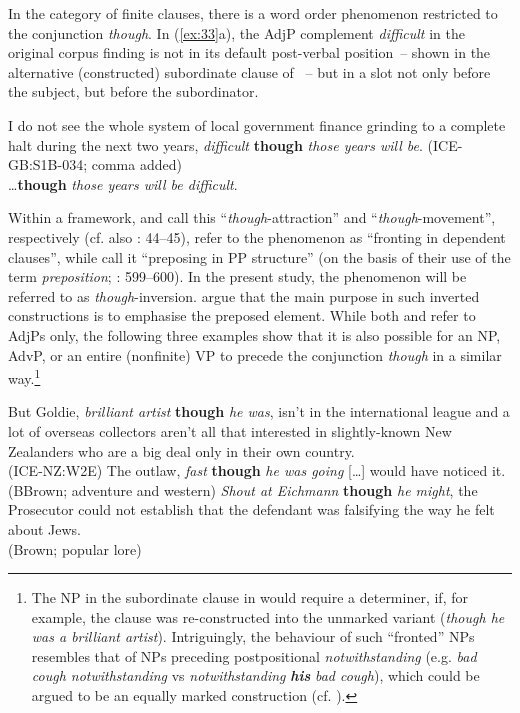 In the category of finite clauses, there is a word order phenomenon restricted to the conjunction \textit{though}. In (\ref{ex:33}a), the AdjP complement \textit{difficult} in the original corpus finding is not in its default post-verbal position~– shown in the alternative (constructed) subordinate clause of ~– but in a slot not only before the subject, but before the subordinator.

\ea\label{ex:33}
    \ea
{\label{bkm:Ref489783741}  I do not see the whole system of local government finance grinding to a complete halt during the next two years, \textit{difficult} \textbf{though} \textit{those years will be}. (ICE-GB:S1B-034; comma added)}\\
    \ex\label{ex:33b}
{ …\textbf{though} \textit{those years will be difficult}.}\\
\z
\z

Within a  framework, \citet[166–167]{Culicover1976} and \citet[213]{Radford1981} call this “\textit{though}-attraction” and “\textit{though}-movement”, respectively (cf. also \citealt{Aarts1988}: 44–45), \citet[908]{BiberEtAl1999} refer to the phenomenon as “fronting in dependent clauses”, while \citet[634]{HuddlestonPullum2002} call it “preposing in PP structure” (on the basis of their use of the term \textit{preposition}; \citeyear{HuddlestonPullum2002}: 599–600). In the present study, the phenomenon will be referred to as \textit{though}-inversion. \citet[909]{BiberEtAl1999} argue that the main purpose in such inverted constructions is to emphasise the preposed element. While both \citet{Culicover1976} and \citet{Radford1981} refer to AdjPs only, the following three examples show that it is also possible for an NP, AdvP, or an entire (nonfinite) VP to precede the conjunction \textit{though} in a similar way.\footnote{The NP in the subordinate clause in  would require a determiner, if, for example, the clause was re-constructed into the unmarked variant (\textit{though he was a brilliant artist}). Intriguingly, the behaviour of such “fronted” NPs resembles that of NPs preceding postpositional \textit{notwithstanding} (e.g. \textit{bad cough notwithstanding} vs \textit{notwithstanding} \textbf{\textit{his}} \textit{bad cough}), which could be argued to be an equally marked construction (cf. \citealt{Schützler2018a}).}

\eanoraggedright\label{ex:34}   \label{bkm:Ref489283807}But Goldie, \textit{brilliant artist} \textbf{though} \textit{he was}, isn’t in the international league and a lot of overseas collectors aren’t all that interested in slightly-known New Zealanders who are a big deal only in their own country. \\(ICE-NZ:W2E)
\ex\label{ex:35} The outlaw, \textit{fast} \textbf{though} \textit{he was going} […] would have noticed it. (BBrown; adventure and western)
\ex\label{ex:36} \textit{Shout at Eichmann} \textbf{though} \textit{he might}, the Prosecutor could not establish that the defendant was falsifying the way he felt about Jews.\\(Brown; popular lore)
\z

